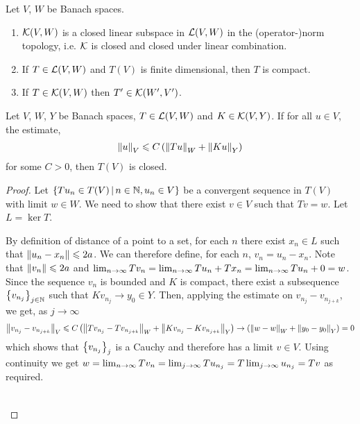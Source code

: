 \documentclass{article}
\begin{document}
\begin{flemma} Let $V$, $W$ be Banach spaces. 
\begin{enumerate}
\item $\K(V, W)$ is a closed linear subspace in $\L(V, W)$ in the (operator-)norm topology, i.e. $\K$ is closed and closed under linear combination. 
\item If $T \in \L(V, W)$ and $T(V)$ is finite dimensional, then $T$ is compact. 
\item If $T \in \K(V, W)$ then $T' \in \K(W', V')$. 
\end{enumerate}
\end{flemma}

\begin{ftheorem} Let $V$, $W$, $Y$ be Banach spaces, $T \in \L(V, W)$ and $K \in \K(V, Y)$. If for all $u \in V$, the estimate, 
\begin{align*}
\norm[u]_V \leq C \brac{\norm[Tu]_W + \norm[Ku]_Y}
\end{align*}
for some $C > 0$, then $T(V)$ is closed. 

\begin{proof}
Let $\set{Tu_n \in T(V) \wh n \in \N, u_n \in V}$ be a convergent sequence in $T(V)$ with limit $w \in W$. We need to show that there exist $v \in V$ such that $T v = w$. Let $L = \ker T$. 

\begin{case} By definition of distance of a point to a set, for each $n$ there exist $x_n \in L$ such that $\norm[u_n - x_n] \leq 2a$. We can therefore define, for each $n$, $v_n = u_n - x_n$. Note that $\norm[v_n] \leq 2a$ and $\Lim Tv_n = \Lim T u_n + Tx_n = \Lim Tu_n + 0 = w$. Since the sequence $v_n$ is bounded and $K$ is compact, there exist a subsequence $\set{v_{n_j}}_{j \in \N}$ such that $Kv_{n_j} \to y_0 \in Y$. Then, applying the estimate on $v_{n_j} - v_{n_{j + k}}$, we get, as $j \to \infty$
\begin{align*}
\norm[v_{n_j} - v_{n_{j + k}}]_V \leq C \brac{\norm[Tv_{n_j} - Tv_{n_{j + k}}]_W + \norm[Kv_{n_j} - Kv_{n_{j + k}}]_Y} \to  \brac{\norm[w - w]_W + \norm[y_0 - y_0]_Y} = 0 
\end{align*}
which shows that $\set{v_{n_j}}_j$ is a Cauchy and therefore has a limit $v \in V$. Using continuity we get $w = \Lim Tv_{n} = \Lim[j] Tu_{n_j} = T \Lim[j] u_{n_j} = Tv$ as required. 
\end{case} \hfill \\


\end{proof}
\end{ftheorem}
\end{document}

